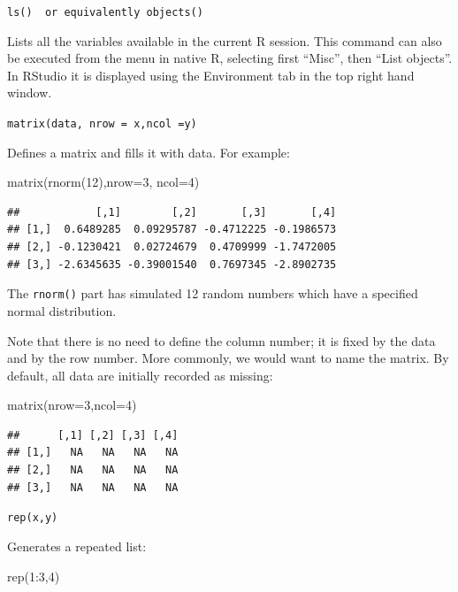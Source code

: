 \documentclass[
]{book}
\newenvironment{Shaded}{\begin{snugshade}}{\end{snugshade}}
\newcommand{\AttributeTok}[1]{\textcolor[rgb]{0.77,0.63,0.00}{#1}}
\newcommand{\DecValTok}[1]{\textcolor[rgb]{0.00,0.00,0.81}{#1}}
\newcommand{\FunctionTok}[1]{\textcolor[rgb]{0.00,0.00,0.00}{#1}}
\newcommand{\NormalTok}[1]{#1}
\newcommand{\SpecialCharTok}[1]{\textcolor[rgb]{0.00,0.00,0.00}{#1}}
\begin{document}
\texttt{ls()\ \ or\ equivalently\ objects()}

Lists all the variables available in the current R session. This command can also be executed from the menu in native R, selecting first ``Misc'', then ``List objects''. In RStudio it is displayed using the Environment tab in the top right hand window.

\texttt{matrix(data,\ nrow\ =\ x,ncol\ =y)}

Defines a matrix and fills it with data. For example:

\begin{Shaded}
\begin{Highlighting}[]
\FunctionTok{matrix}\NormalTok{(}\FunctionTok{rnorm}\NormalTok{(}\DecValTok{12}\NormalTok{),}\AttributeTok{nrow=}\DecValTok{3}\NormalTok{, }\AttributeTok{ncol=}\DecValTok{4}\NormalTok{)}
\end{Highlighting}
\end{Shaded}

\begin{verbatim}
##            [,1]        [,2]       [,3]       [,4]
## [1,]  0.6489285  0.09295787 -0.4712225 -0.1986573
## [2,] -0.1230421  0.02724679  0.4709999 -1.7472005
## [3,] -2.6345635 -0.39001540  0.7697345 -2.8902735
\end{verbatim}

The \texttt{rnorm()} part has simulated 12 random numbers which have a specified normal distribution.

Note that there is no need to define the column number; it is fixed by the data and by the row number. More commonly, we would want to name the matrix. By default, all data are initially recorded as missing:

\begin{Shaded}
\begin{Highlighting}[]
\FunctionTok{matrix}\NormalTok{(}\AttributeTok{nrow=}\DecValTok{3}\NormalTok{,}\AttributeTok{ncol=}\DecValTok{4}\NormalTok{)}
\end{Highlighting}
\end{Shaded}

\begin{verbatim}
##      [,1] [,2] [,3] [,4]
## [1,]   NA   NA   NA   NA
## [2,]   NA   NA   NA   NA
## [3,]   NA   NA   NA   NA
\end{verbatim}

\texttt{rep(x,y)}

Generates a repeated list:

\begin{Shaded}
\begin{Highlighting}[]
\FunctionTok{rep}\NormalTok{(}\DecValTok{1}\SpecialCharTok{:}\DecValTok{3}\NormalTok{,}\DecValTok{4}\NormalTok{)}
\end{Highlighting}
\end{Shaded}
\end{document}
